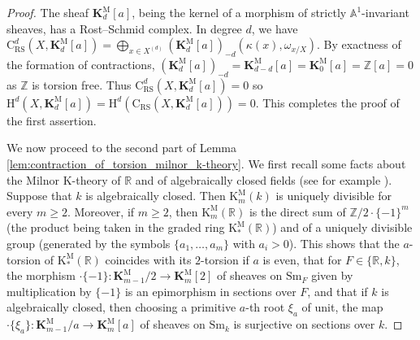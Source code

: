 \documentclass[11pt,leqno]{amsart}
\renewcommand{\1}{{\rm 1\hspace*{-0.4ex}%
\rule{0.1ex}{1.52ex}\hspace*{0.2ex}}}
\newcommand{\Sm}{\mathrm{Sm}}
\newcommand{\Hr}{{\mathrm {H}}}
\newcommand{\<}[1]{{\langle}#1 {\rangle}}
\newcommand{\Rb}{\mathbb{R}}
\newcommand{\Kr}{\mathrm{K}}
\newcommand{\Cr}{\mathrm{C}}
\newcommand{\RS}{\mathrm{RS}}
\newcommand{\Zb}{\mathbb{Z}}
\newcommand{\Kbf}{\mathbf{K}}
\newcommand{\Abb}{\mathbb{A}}
\newcommand{\Mr}{\mathrm{M}}
\theoremstyle{plain}
\theoremstyle{definition}
\theoremstyle{remark}
\numberwithin{equation}{section}
\begin{document}
\begin{proof}
The sheaf $\Kbf_d^\Mr[a]$, being the kernel of a morphism of strictly $\Abb^1$-invariant sheaves, has a Rost--Schmid complex. In degree $d$, we have $\Cr_\RS^d(X,\Kbf_d^\Mr[a])=\bigoplus_{x\in X^{(d)}}(\Kbf_d^\Mr[a])_{-d}(\kappa(x),\omega_{x/X})$. By exactness of the formation of contractions, $(\Kbf_d^\Mr[a])_{-d}=\Kbf_{d-d}^\Mr[a]=\Kbf_0^\Mr[a]=\Zb[a]=0$ as $\Zb$ is torsion free. Thus $\Cr_\RS^d(X,\Kbf_d^\Mr[a])=0$ so $\Hr^d(X,\Kbf_d^\Mr[a])=\Hr^d(\Cr_\RS(X,\Kbf_d^\Mr[a]))=0$. This completes the proof of the first assertion.

We now proceed to the second part of Lemma \ref{lem:contraction_of_torsion_milnor_k-theory}. We first recall some facts about the Milnor $\Kr$-theory of $\Rb$ and of algebraically closed fields (see for example \cite[Chapter III, Section 7, Example 7.2 (b), (c)]{weibelKbookIntroductionAlgebraic2013}). Suppose that $k$ is algebraically closed. Then $\Kr_m^\Mr(k)$ is uniquely divisible for every $m\geq 2$. Moreover, if $m\geq 2$, then $\Kr_m^\Mr(\Rb)$ is the direct sum of $\Zb/2\cdot\{-1\}^m$ (the product being taken in the graded ring $\Kr_*^\Mr(\Rb)$) and of a uniquely divisible group (generated by the symbols $\{a_1,\ldots,a_m\}$ with $a_i>0$). This shows that the $a$-torsion of $\Kr_*^\Mr(\Rb)$ coincides with its $2$-torsion if $a$ is even, that for $F\in\{\Rb,k\}$, the morphism $\cdot\{-1\}:\Kbf_{m-1}^\Mr/2\rightarrow\Kbf_m^\Mr[2]$ of sheaves on $\Sm_F$ given by multiplication by $\{-1\}$ is an epimorphism in sections over $F$, and that if $k$ is algebraically closed, then choosing a primitive $a$-th root $\xi_a$ of unit, the map $\cdot\{\xi_a\}:\Kbf_{m-1}^\Mr/a\rightarrow\Kbf_m^\Mr[a]$ of sheaves on $\Sm_k$ is surjective on sections over $k$.


\end{proof}
\end{document}
